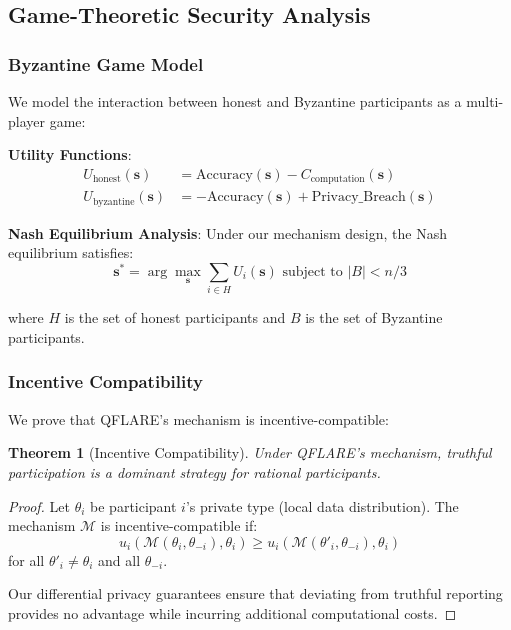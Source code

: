 \documentclass[journal,onecolumn]{IEEEtran}
\newtheorem{theorem}{Theorem}
\begin{document}
\subsection{Game-Theoretic Security Analysis}

\subsubsection{Byzantine Game Model}

We model the interaction between honest and Byzantine participants as a multi-player game:

\textbf{Utility Functions}:
\begin{align}
U_{\text{honest}}(\mathbf{s}) &= \text{Accuracy}(\mathbf{s}) - C_{\text{computation}}(\mathbf{s}) \\
U_{\text{byzantine}}(\mathbf{s}) &= -\text{Accuracy}(\mathbf{s}) + \text{Privacy\_Breach}(\mathbf{s})
\end{align}

\textbf{Nash Equilibrium Analysis}:
Under our mechanism design, the Nash equilibrium satisfies:
$$\mathbf{s}^* = \arg\max_{\mathbf{s}} \sum_{i \in H} U_i(\mathbf{s}) \text{ subject to } |B| < n/3$$

where $H$ is the set of honest participants and $B$ is the set of Byzantine participants.

\subsubsection{Incentive Compatibility}

We prove that QFLARE's mechanism is incentive-compatible:

\begin{theorem}[Incentive Compatibility]
Under QFLARE's mechanism, truthful participation is a dominant strategy for rational participants.
\end{theorem}

\begin{proof}
Let $\theta_i$ be participant $i$'s private type (local data distribution). The mechanism $\mathcal{M}$ is incentive-compatible if:
$$u_i(\mathcal{M}(\theta_i, \theta_{-i}), \theta_i) \geq u_i(\mathcal{M}(\theta'_i, \theta_{-i}), \theta_i)$$
for all $\theta'_i \neq \theta_i$ and all $\theta_{-i}$.

Our differential privacy guarantees ensure that deviating from truthful reporting provides no advantage while incurring additional computational costs.
\end{proof}
\end{document}
